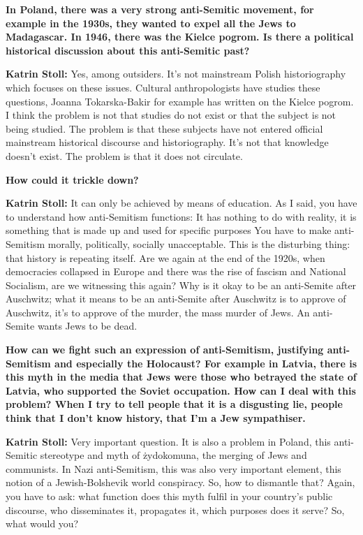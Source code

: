\textbf{In Poland, there was a very strong anti-Semitic movement, for example in the 1930s, they wanted to expel all the Jews to Madagascar. In 1946, there was the Kielce pogrom. Is there a political historical discussion about this anti-Semitic past?} 

\textbf{Katrin Stoll:} Yes, among outsiders. It’s not mainstream Polish historiography which focuses on these issues. Cultural anthropologists have studies these questions, Joanna Tokarska-Bakir for example has written on the Kielce pogrom. I think the problem is not that studies do not exist or that the subject is not being studied. The problem is that these subjects have not entered official mainstream historical discourse and historiography. It’s not that knowledge doesn’t exist. The problem is that it does not circulate.  

\textbf{How could it trickle down?}

\textbf{Katrin Stoll:} It can only be achieved by means of education. As I said, you have to understand how anti-Semitism functions: It has nothing to do with reality, it is something that is made up and used for specific purposes You have to make anti-Semitism morally, politically, socially unacceptable. This is the disturbing thing: that history is repeating itself. Are we again at the end of the 1920s, when democracies collapsed in Europe and there was the rise of fascism and National Socialism, are we witnessing this again?  Why is it okay to be an anti-Semite after Auschwitz; what it means to be an anti-Semite after Auschwitz is to approve of Auschwitz, it’s to approve of the murder, the mass murder of Jews. An anti-Semite wants Jews to be dead.  

\textbf{How can we fight such an expression of anti-Semitism, justifying anti-Semitism and especially the Holocaust? For example in Latvia, there is this myth in the media that Jews were those who betrayed the state of Latvia, who supported the Soviet occupation. How can I deal with this problem? When I try to tell people that it is a disgusting lie, people think that I don't know history, that I'm a Jew sympathiser.}

\textbf{Katrin Stoll:} Very important question. It is also a problem in Poland, this anti-Semitic stereotype and myth of żydokomuna, the merging of Jews and communists. In Nazi anti-Semitism, this was also very important element, this notion of a Jewish-Bolshevik world conspiracy. So, how to dismantle that? Again, you have to ask: what function does this myth fulfil in your country’s public discourse, who disseminates it, propagates it, which purposes does it serve? So, what would you? 

